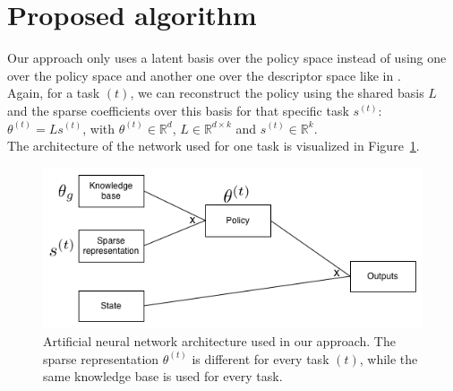 \documentclass[a4paper, 11pt]{article}
\begin{document}
\section{Proposed algorithm}
\label{sec:proposed_algorithm} %
Our approach only uses a latent basis over the policy space instead of using one over the policy space and another one over the descriptor space like in \cite{Isele2016UsingLearning}.\\
Again, for a task $(t)$, we can reconstruct the policy using the shared basis $L$ and the sparse coefficients over this basis for that specific task $s^{(t)}$: $\theta^{(t)} = Ls^{(t)}$, with $\theta^{(t)} \in \mathbb{R}^d$, $L \in \mathbb{R}^{d \times k}$ and $s^{(t)} \in \mathbb{R}^k$.\\
The architecture of the network used for one task is visualized in Figure~\ref{fig:algonn}.
\begin{figure}[htb]
    \centering
    \includegraphics[width=\linewidth]{images/knowledge_transfer.png}
    \caption[Artificial neural network architecture used in our approach]{Artificial neural network architecture used in our approach. The sparse representation $\theta^{(t)}$ is different for every task $(t)$, while the same knowledge base is used for every task.}
    \label{fig:algonn}
\end{figure}
\end{document}
